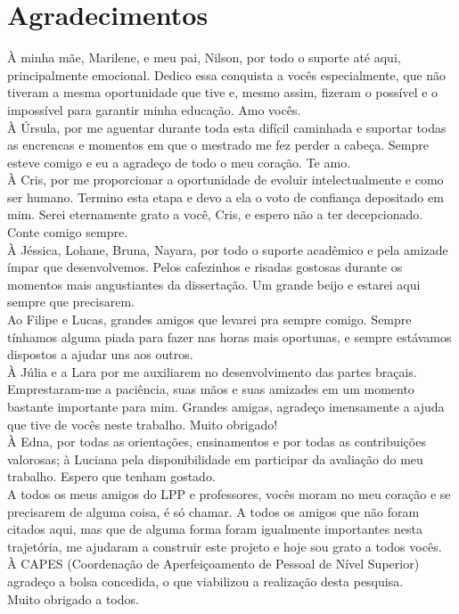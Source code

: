 \section*{Agradecimentos}
\vspace*{1.5cm}
\thispagestyle{empty}
\begin{onehalfspace}
À minha mãe, Marilene, e meu pai, Nilson, por todo o suporte até aqui, principalmente emocional. Dedico essa conquista a vocês especialmente, que não tiveram a mesma oportunidade que tive e, mesmo assim, fizeram o possível e o impossível para garantir minha educação. Amo vocês.\\
À Úrsula, por me aguentar durante toda esta difícil caminhada e suportar todas as encrencas e momentos em que o mestrado me fez perder a cabeça. Sempre esteve comigo e eu a agradeço de todo o meu coração. Te amo.\\
À Cris, por me proporcionar a oportunidade de evoluir intelectualmente e como ser humano. Termino esta etapa e devo a ela o voto de confiança depositado em mim. Serei eternamente grato a você, Cris, e espero não a ter decepcionado. Conte comigo sempre.\\
À Jéssica, Lohane, Bruna, Nayara, por todo o suporte acadêmico e pela amizade ímpar que desenvolvemos. Pelos cafezinhos e risadas gostosas durante os momentos mais angustiantes da dissertação. Um grande beijo e estarei aqui sempre que precisarem.\\
Ao Filipe e Lucas, grandes amigos que levarei pra sempre comigo. Sempre tínhamos alguma piada para fazer nas horas mais oportunas, e sempre estávamos dispostos a ajudar uns aos outros.\\
À Júlia e a Lara por me auxiliarem no desenvolvimento das partes braçais. Emprestaram-me a paciência, suas mãos e suas amizades em um momento bastante importante para mim. Grandes amigas, agradeço imensamente a ajuda que tive de vocês neste trabalho. Muito obrigado!\\
À Edna, por todas as orientações, ensinamentos e por todas as contribuições valorosas; à Luciana pela disponibilidade em participar da avaliação do meu trabalho. Espero que tenham gostado.\\
A todos os meus amigos do LPP e professores, vocês moram no meu coração e se precisarem de alguma coisa, é só chamar. A todos os amigos que não foram citados aqui, mas que de alguma forma foram igualmente importantes nesta trajetória, me ajudaram a construir este projeto e hoje sou grato a todos vocês.\\
À CAPES (Coordenação de Aperfeiçoamento de Pessoal de Nível Superior) agradeço a bolsa concedida, o que viabilizou a realização desta pesquisa.\\
Muito obrigado a todos.\\
\end{onehalfspace}
